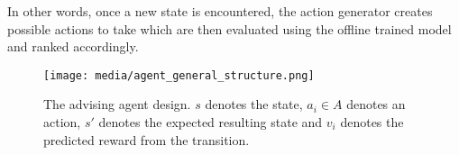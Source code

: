 In other words, once a new state is encountered, the action generator creates possible actions to take which are then evaluated using the offline trained model and ranked accordingly.   



\begin{figure}[t]
\centering
\texttt{[image: media/agent\_general\_structure.png]}
\caption{The advising agent design. $s$ denotes the state, $a_i\in A$ denotes an action, $s'$ denotes the expected resulting state and $v_i$ denotes the predicted reward from the transition.}
\label{fig:agent_structure}
\end{figure}

